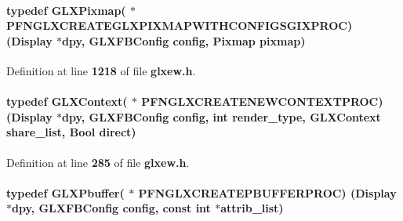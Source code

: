 \paragraph[{P\+F\+N\+G\+L\+X\+C\+R\+E\+A\+T\+E\+G\+L\+X\+P\+I\+X\+M\+A\+P\+W\+I\+T\+H\+C\+O\+N\+F\+I\+G\+S\+G\+I\+X\+P\+R\+OC}]{\setlength{\rightskip}{0pt plus 5cm}typedef {\bf G\+L\+X\+Pixmap}( $\ast$  P\+F\+N\+G\+L\+X\+C\+R\+E\+A\+T\+E\+G\+L\+X\+P\+I\+X\+M\+A\+P\+W\+I\+T\+H\+C\+O\+N\+F\+I\+G\+S\+G\+I\+X\+P\+R\+OC) (Display $\ast$dpy, {\bf G\+L\+X\+F\+B\+Config} config, Pixmap pixmap)}\label{glxew_8h_abf27c479b7cabf7b97e4b3c061fc0e19}


Definition at line {\bf 1218} of file {\bf glxew.\+h}.

\paragraph[{P\+F\+N\+G\+L\+X\+C\+R\+E\+A\+T\+E\+N\+E\+W\+C\+O\+N\+T\+E\+X\+T\+P\+R\+OC}]{\setlength{\rightskip}{0pt plus 5cm}typedef {\bf G\+L\+X\+Context}( $\ast$  P\+F\+N\+G\+L\+X\+C\+R\+E\+A\+T\+E\+N\+E\+W\+C\+O\+N\+T\+E\+X\+T\+P\+R\+OC) (Display $\ast$dpy, {\bf G\+L\+X\+F\+B\+Config} config, {\bf int} render\+\_\+type, {\bf G\+L\+X\+Context} share\+\_\+list, Bool direct)}\label{glxew_8h_a100eb573b9ba67ee48e487a24a8f4e0e}


Definition at line {\bf 285} of file {\bf glxew.\+h}.

\paragraph[{P\+F\+N\+G\+L\+X\+C\+R\+E\+A\+T\+E\+P\+B\+U\+F\+F\+E\+R\+P\+R\+OC}]{\setlength{\rightskip}{0pt plus 5cm}typedef {\bf G\+L\+X\+Pbuffer}( $\ast$  P\+F\+N\+G\+L\+X\+C\+R\+E\+A\+T\+E\+P\+B\+U\+F\+F\+E\+R\+P\+R\+OC) (Display $\ast$dpy, {\bf G\+L\+X\+F\+B\+Config} config, const {\bf int} $\ast$attrib\+\_\+list)}\label{glxew_8h_afc9bd78a8c1b9dbd2616f40fc0612818}



